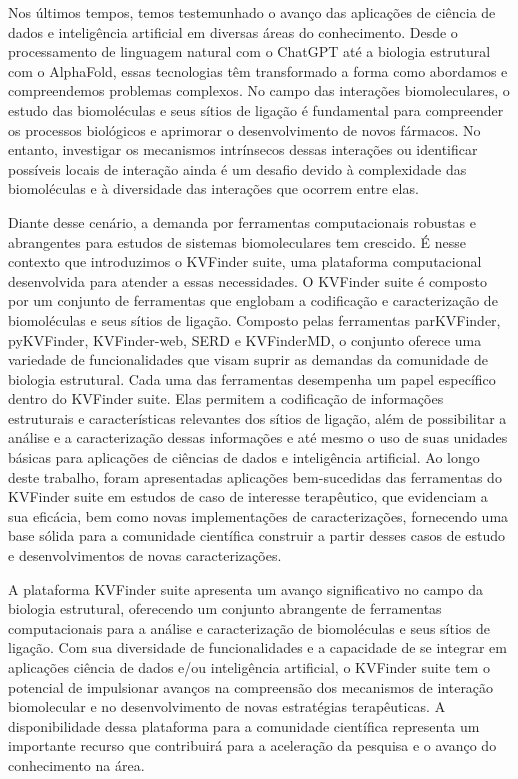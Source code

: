 \documentclass[Portugues]{phdquali}
\begin{document}
\begin{resumo}

Nos últimos tempos, temos testemunhado o avanço das aplicações de ciência de dados e inteligência artificial em diversas áreas do conhecimento. Desde o processamento de linguagem natural com o ChatGPT até a biologia estrutural com o AlphaFold, essas tecnologias têm transformado a forma como abordamos e compreendemos problemas complexos. No campo das interações biomoleculares, o estudo das biomoléculas e seus sítios de ligação é fundamental para compreender os processos biológicos e aprimorar o desenvolvimento de novos fármacos. No entanto, investigar os mecanismos intrínsecos dessas interações ou identificar possíveis locais de interação ainda é um desafio devido à complexidade das biomoléculas e à diversidade das interações que ocorrem entre elas. 

Diante desse cenário, a demanda por ferramentas computacionais robustas e abrangentes para estudos de sistemas biomoleculares tem crescido. É nesse contexto que introduzimos o KVFinder suite, uma plataforma computacional desenvolvida para atender a essas necessidades. O KVFinder suite é composto por um conjunto de ferramentas que englobam a codificação e caracterização de biomoléculas e seus sítios de ligação. Composto pelas ferramentas parKVFinder, pyKVFinder, KVFinder-web, SERD e KVFinderMD, o conjunto oferece uma variedade de funcionalidades que visam suprir as demandas da comunidade de biologia estrutural. Cada uma das ferramentas desempenha um papel específico dentro do KVFinder suite. Elas permitem a codificação de informações estruturais e características relevantes dos sítios de ligação, além de possibilitar a análise e a caracterização dessas informações e até mesmo o uso de suas unidades básicas para aplicações de ciências de dados e inteligência artificial. Ao longo deste trabalho, foram apresentadas aplicações bem-sucedidas das ferramentas do KVFinder suite em estudos de caso de interesse terapêutico, que evidenciam a sua eficácia, bem como novas implementações de caracterizações, fornecendo uma base sólida para a comunidade científica construir a partir desses casos de estudo e desenvolvimentos de novas caracterizações.

A plataforma KVFinder suite apresenta um avanço significativo no campo da biologia estrutural, oferecendo um conjunto abrangente de ferramentas computacionais para a análise e caracterização de biomoléculas e seus sítios de ligação. Com sua diversidade de funcionalidades e a capacidade de se integrar em aplicações ciência de dados e/ou inteligência artificial, o KVFinder suite tem o potencial de impulsionar avanços na compreensão dos mecanismos de interação biomolecular e no desenvolvimento de novas estratégias terapêuticas. A disponibilidade dessa plataforma para a comunidade científica representa um importante recurso que contribuirá para a aceleração da pesquisa e o avanço do conhecimento na área.

\end{resumo}
\end{document}
